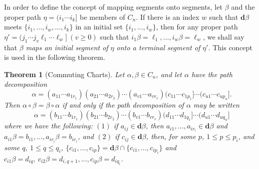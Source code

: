 \documentclass{surv-l}
\numberwithin{equation}{section}
\numberwithin{table}{section}
\numberwithin{figure}{section}
\newtheorem{theorem}[equation]{Theorem}
\theoremstyle{definition}
\begin{document}
In order to define the concept of mapping segments onto segments,
let $\beta$ and the proper path $\eta=(i_{1}\cdots i_{k}]$ be
members of $C_{n}$. If there is an index $w$ such that
$\mathbf{d}\beta$ meets $\{i_{1},\ldots,i_{w},\ldots, i_{k}\}$ in
an initial set $\{i_{1},\ldots,i_{w}\}$, then for any proper path
$\eta'=(j_{1}\cdots j_{v}\ell_{1}\cdots \ell_{w}]\ (v\geq 0)$ such
that $i_{1}\beta= \ell_{1},\ldots, i_{w}\beta=\ell_{w}$, we shall
say that $\beta$ \emph{maps an initial segment of} $\eta$
\emph{onto a terminal segment of} $\eta'$. This concept is used in
the following theorem.

\begin{theorem}[Commuting Charts]\label{thm3.10.1}
Let $\alpha,\beta\in C_{n}$, and let $\alpha$ have the path
decomposition
\[
\alpha=(a_{11}\cdots a_{1r_{1}})(a_{21}\cdots
a_{2r_{2}})\cdots(a_{v1}\cdots a_{vr_{v}})(c_{11}\cdots
c_{1p_{1}}]\cdots(c_{u1}\cdots c_{up_{u}}].
\]
Then $\alpha \circ\beta=\beta \circ\alpha$ if and only if the path
decomposition of $\alpha$ may be written
\[
\alpha=(b_{11}\cdots b_{1r_{1}})(b_{21}\cdots b_{2r_{2}})\cdots(b_{v1}\cdots
b_{vr_{v}})(d_{11}\cdots d_{1q_{1}}]\cdots(d_{u1}\cdots
d_{uq_{u}}]
\]
where we have the following: $(1)$ if $ a_{ij}\in
\mathbf{d}\beta$, then $a_{i1},\ldots, a_{ir_{i}}\in
\mathbf{d}\beta$ and $a_{i1}\beta=b_{i1},\ldots,
a_{ir_{i}}\beta=b_{ir_{i}}$, and $(2)$ if $c_{ij}\in
\mathbf{d}\beta$, then, for some $p$, $1\leq p\leq p_{i}$, and some
$q$, $1\leq q\leq q_{i}$, $\{c_{i1},\ldots,
c_{ip}\}=\mathbf{d}\beta\cap\{c_{i1},\ldots, c_{ip_{i}}\}$ and
$c_{i1}\beta=d_{iq},\ c_{i2}\beta=d_{i,q+1},\ldots,
c_{ip}\beta=d_{iq_{i}}$.
\end{theorem}
\end{document}
